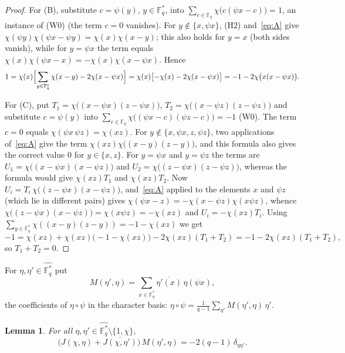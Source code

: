 \documentclass[11pt]{amsart}
\newtheorem{lemma}[theorem]{Lemma}
\theoremstyle{definition}
\theoremstyle{remark}
\numberwithin{equation}{section}
\newcommand{\F}{\mathbb{F}_q}
\newcommand{\Fs}{\mathbb{F}_q^{*}}
\newcommand{\conj}[1]{\overline{#1}}
\begin{document}
\begin{proof}
For (B), substitute $c=\psi(y)$, $y\in\Fs$, into $\sum_{c\in\F}\chi\bigl(c(\psi x-c)\bigr)=1$, an instance of (W0) (the term $c=0$
vanishes). For $y\notin\{x,\psi x\}$, (H2) and~\eqref{eq:A} give $\chi(\psi y)\chi(\psi x-\psi y)=\chi(x)\chi(x-y)$; this also
holds for $y=x$ (both sides vanish), while for $y=\psi x$ the term equals $\chi(x)\chi(\psi x-x)=-\chi(x)\chi(x-\psi x)$. Hence
\[
1=\chi(x)\Bigl[\sum_{y\in\Fs}\chi(x-y)-2\chi(x-\psi x)\Bigr]=\chi(x)\bigl[-\chi(x)-2\chi(x-\psi x)\bigr]=-1-2\chi\bigl(x(x-\psi x)\bigr).
\]

For (C), put $T_1=\chi\bigl((x-\psi x)(z-\psi x)\bigr)$, $T_2=\chi\bigl((x-\psi z)(z-\psi z)\bigr)$ and substitute $c=\psi(y)$ into
$\sum_{c\in\F}\chi\bigl((\psi x-c)(\psi z-c)\bigr)=-1$ (W0). The term $c=0$ equals $\chi(\psi x\,\psi z)=\chi(xz)$. For
$y\notin\{x,\psi x,z,\psi z\}$, two applications of~\eqref{eq:A} give the term $\chi(xz)\chi\bigl((x-y)(z-y)\bigr)$, and this
formula also gives the correct value $0$ for $y\in\{x,z\}$. For $y=\psi x$ and $y=\psi z$ the terms are
$U_1=\chi\bigl((x-\psi x)(x-\psi z)\bigr)$ and $U_2=\chi\bigl((z-\psi x)(z-\psi z)\bigr)$, whereas the formula would give
$\chi(xz)T_1$ and $\chi(xz)T_2$. Now $U_i=T_i\,\chi\bigl((z-\psi x)(x-\psi z)\bigr)$, and~\eqref{eq:A} applied to the elements $x$ and
$\psi z$ (which lie in different pairs) gives $\chi(\psi x-z)=-\chi(x-\psi z)\chi(x\psi z)$, whence
$\chi\bigl((z-\psi x)(x-\psi z)\bigr)=\chi(x\psi z)=-\chi(xz)$ and $U_i=-\chi(xz)T_i$. Using
$\sum_{y\in\Fs}\chi((x-y)(z-y))=-1-\chi(xz)$ we get
\[
-1=\chi(xz)+\chi(xz)\bigl(-1-\chi(xz)\bigr)-2\chi(xz)(T_1+T_2)=-1-2\chi(xz)(T_1+T_2),
\]
so $T_1+T_2=0$.
\end{proof}

For $\eta,\eta'\in\widehat{\Fs}$ put
\[
M(\eta',\eta)=\sum_{x\in\Fs}\conj{\eta'(x)}\,\eta(\psi x),
\]
the coefficients of $\eta\circ\psi$ in the character basis: $\eta\circ\psi=\frac1{q-1}\sum_{\eta'}M(\eta',\eta)\,\eta'$.

\begin{lemma}\label{lem:jacobi}
For all $\eta,\eta'\in\widehat{\Fs}\setminus\{1,\chi\}$,
\[
\bigl(J(\chi,\eta)+\conj{J(\chi,\eta')}\bigr)\,M(\eta',\eta)=-2(q-1)\,\delta_{\eta\eta'} .
\]
\end{lemma}
\end{document}

